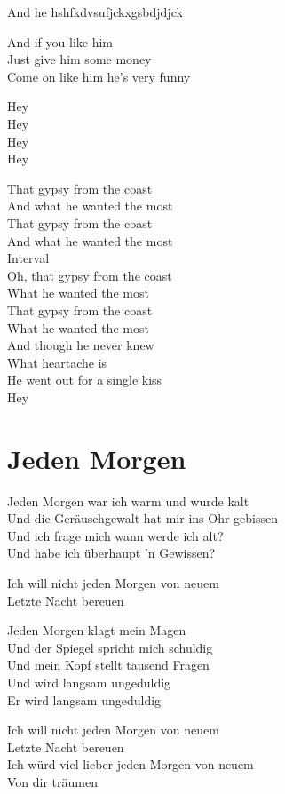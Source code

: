 \documentclass[]{book}
\begin{document}
And he hshfkdvsufjckxgsbdjdjck

And if you like him\\
Just give him some money\\
Come on like him he's very funny

Hey\\
Hey\\
Hey\\
Hey

That gypsy from the coast\\
And what he wanted the most\\
That gypsy from the coast\\
And what he wanted the most\\
Interval\\
Oh, that gypsy from the coast\\
What he wanted the most\\
That gypsy from the coast\\
What he wanted the most\\
And though he never knew\\
What heartache is\\
He went out for a single kiss\\
Hey

\hypertarget{jeden-morgen-1}{%
\section{Jeden Morgen}\label{jeden-morgen-1}}

Jeden Morgen war ich warm und wurde kalt\\
Und die Geräuschgewalt hat mir ins Ohr gebissen\\
Und ich frage mich wann werde ich alt?\\
Und habe ich überhaupt 'n Gewissen?

Ich will nicht jeden Morgen von neuem\\
Letzte Nacht bereuen

Jeden Morgen klagt mein Magen\\
Und der Spiegel spricht mich schuldig\\
Und mein Kopf stellt tausend Fragen\\
Und wird langsam ungeduldig\\
Er wird langsam ungeduldig

Ich will nicht jeden Morgen von neuem\\
Letzte Nacht bereuen\\
Ich würd viel lieber jeden Morgen von neuem\\
Von dir träumen
\end{document}
